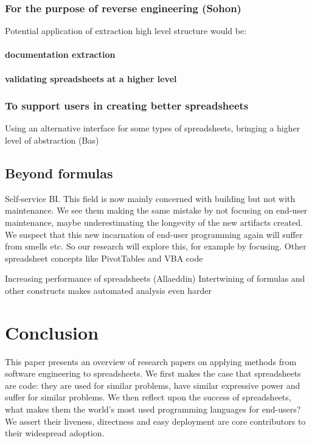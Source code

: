 \documentclass[conference]{IEEEtran}
\begin{document}
\subsubsection{For the purpose of reverse engineering (Sohon)}
Potential application of extraction high level structure would be:
\paragraph{documentation extraction}
\paragraph{validating spreadsheets at a higher level}

\subsubsection{To support users in creating better spreadsheets}
Using  an alternative interface for some types of spreadsheets, bringing a higher level of abstraction (Bas)

\subsection{Beyond formulas}

  Self-service BI. This field is now mainly concerned with building but not with maintenance. We see them making the same mistake by not focusing on end-user maintenance, maybe underestimating the longevity of the new artifacts created. We suspect that this new incarnation of end-user programming again will suffer from smells etc. So our research will explore this, for example by focusing. Other spreadsheet concepts like PivotTables and VBA code
  

Increasing performance of spreadsheets (Allaeddin)
Intertwining of formulas and other constructs makes automated analysis even harder



\section{Conclusion}
This paper presents an overview of research papers on applying methods from software engineering to spreadsheets. We first makes the case that spreadsheets are code: they are used for similar problems, have similar expressive power and suffer for similar problems. We then reflect upon the success of spreadsheets, what makes them the world's most used programming languages for end-users? We assert their liveness, directness and easy deployment are core contributors to their widespread adoption. 
\end{document}
